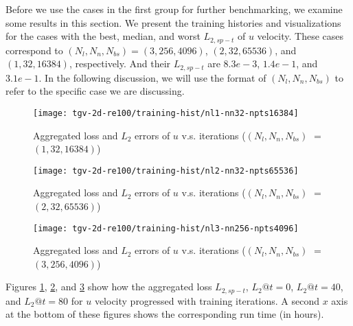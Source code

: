 
Before we use the cases in the first group for further benchmarking, we examine some results in this section.
We present the training histories and visualizations for the cases with the best, median, and worst $L_{2,sp-t}$ of $u$ velocity.
These cases correspond to $(N_l, N_n, N_{bs}) = (3, 256, 4096)$, $(2, 32, 65536)$, and $(1, 32, 16384)$, respectively.
And their $L_{2,sp-t}$ are $8.3e-3$, $1.4e-1$, and $3.1e-1$.
In the following discussion, we will use the format of $(N_l, N_n, N_{bs})$ to refer to the specific case we are discussing.

\begin{figure}[hbt!]
\centering%
\texttt{[image: tgv-2d-re100/training-hist/nl1-nn32-npts16384]}%
\caption[%
    Aggregated loss and $L_2$ errors of $u$ v.s. iterations ($(N_l, N_n, N_{bs})=(1, 32, 16384)$)%
]{%
    Aggregated loss and $L_2$ errors of $u$ v.s. iterations ($(N_l, N_n, N_{bs})$ $=$ $(1, 32, 16384)$)%
}\label{fig:nl1-nn32-npts16384-loss-err-hist}%
\end{figure}

\begin{figure}[hbt!]
\centering%
\texttt{[image: tgv-2d-re100/training-hist/nl2-nn32-npts65536]}%
\caption[%
    Aggregated loss and $L_2$ errors of $u$ v.s. iterations ($(N_l, N_n, N_{bs})=(2, 32, 65536)$)%
]{%
    Aggregated loss and $L_2$ errors of $u$ v.s. iterations ($(N_l, N_n, N_{bs})$ $=$ $(2, 32, 65536)$)%
}\label{fig:nl2-nn32-npts65536-loss-err-hist}%
\end{figure}

\begin{figure}[hbt!]
\centering%
\texttt{[image: tgv-2d-re100/training-hist/nl3-nn256-npts4096]}%
\caption[%
    Aggregated loss and $L_2$ errors of $u$ v.s. iterations ($(N_l, N_n, N_{bs})=(3, 256, 4096)$)%
]{%
    Aggregated loss and $L_2$ errors of $u$ v.s. iterations ($(N_l, N_n, N_{bs})$ $=$ $(3, 256, 4096)$)%
}\label{fig:nl3-nn256-npts4096-loss-err-hist}%
\end{figure}

Figures \ref{fig:nl1-nn32-npts16384-loss-err-hist}, \ref{fig:nl2-nn32-npts65536-loss-err-hist}, and \ref{fig:nl3-nn256-npts4096-loss-err-hist} show how the aggregated loss $L_{2,sp-t}$, $L_2@t=0$, $L_2@t=40$, and $L_2@t=80$ for $u$ velocity progressed with training iterations.
A second $x$ axis at the bottom of these figures shows the corresponding run time (in hours).

